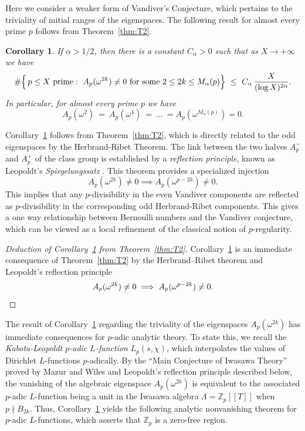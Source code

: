 \documentclass[12pt]{amsart}
\theoremstyle{plain}
\newtheorem{corollary}[theorem]{Corollary}
\theoremstyle{definition}
\newcommand{\ZZ}{\mathbb{Z}}
\begin{document}
Here we consider a weaker form of Vandiver's Conjecture,
which pertains to the triviality of initial ranges of the eigenspaces.
The following result for almost every prime $p$ follows from Theorem~\ref{thm:T2}.

\begin{corollary}\label{thm:T1}
If $\alpha>1/2$, then there is a constant
$C_{\alpha}>0$ such that as $X\rightarrow +\infty$ we have
\[
  \#\Bigl\{\,p\le X \text{ prime}:\  A_p(\omega^{2k})\neq 0 \ \text{for some}\ 2\leq 2k\leq M_{\alpha}(p) \Bigr\}
  \ \le\ C_{\alpha}\,\frac{X}{(\log X)^{2\alpha}}.
\]
In particular, for almost every prime $p$ we have
\[ A_p(\omega^2) \ = \ A_p(\omega^4)\ = \ \dots \ = A_p(\omega^{M_{\alpha}(p)})=0. \]
\end{corollary}
\smallskip

Corollary~\ref{thm:T1} follows from Theorem~\ref{thm:T2},
which is directly related to the odd eigenspaces by the Herbrand-Ribet Theorem.
The link between the two halves $A_p^{-}$ and $A_p^+$ of the class group is
established by a {\it reflection principle}, known as Leopoldt's \textit{Spiegelungssatz} \cite{leopoldt}.
This theorem provides a specialized injection
\[ A_p(\omega^{2k}) \neq 0 \implies A_p(\omega^{p-2k}) \neq 0. \]
This implies that any $p$-divisibility in the even Vandiver components are
reflected as $p$-divisibility in the corresponding odd Herbrand-Ribet components.
This gives a one way relationship between Bernoulli numbers and the Vandiver conjecture,
which can be viewed as a local refinement of the classical notion of $p$-regularity.



\begin{proof}[Deduction of Corollary~\ref{thm:T1} from Theorem~\ref{thm:T2}]
Corollary~\ref{thm:T1} is an immediate consequence of Theorem~\ref{thm:T2} by the
Herbrand--Ribet theorem and Leopoldt's reflection principle
\[ A_p(\omega^{2k}) \neq 0 \implies A_p(\omega^{p-2k}) \neq 0. \qedhere \]
\end{proof}



The result of Corollary~\ref{thm:T1} regarding the triviality of the eigenspaces
$A_p(\omega^{2k})$ has immediate consequences for $p$-adic analytic theory.
To state this, we recall the \textit{Kubota-Leopoldt $p$-adic $L$-function} $L_p(s, \chi)$,
which interpolates the values of Dirichlet $L$-functions $p$-adically.
By the ``Main Conjecture of Iwasawa Theory'' proved by Mazur and Wiles
\cite{MazurWiles} and Leopoldt's reflection principle described below,
the vanishing of the algebraic eigenspace $A_p(\omega^{2k})$ is equivalent to
the associated $p$-adic $L$-function being a unit in the Iwasawa algebra
$\Lambda = \mathbb{Z}_p[[T]]$ when $p \nmid B_{2k}$.
Thus, Corollary~\ref{thm:T1} yields the following analytic nonvanishing theorem for $p$-adic $L$-functions,
which asserts that $\ZZ_p$ is a zero-free region.
\end{document}
